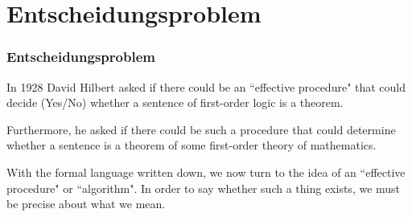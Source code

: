 \documentclass{beamer}
\theoremstyle{indentDefn} \newtheorem{defn}[]{Definition}
\begin{document}











\section{Entscheidungsproblem}

\begin{frame}
  \frametitle{Entscheidungsproblem}

	In 1928 David Hilbert asked if there could be an ``effective procedure" that could decide (Yes/No) whether a sentence of first-order logic is a theorem. 

	\vspace{0.5cm}

	Furthermore, he asked if there could be such a procedure that could determine whether a sentence is a theorem of some first-order theory of mathematics.

	\vspace{0.5cm}
 
  	With the formal language written down, we now turn to the idea of an ``effective procedure" or ``algorithm". In order to say whether such a thing exists, we must be precise about what we mean. 

\end{frame}
\end{document}
